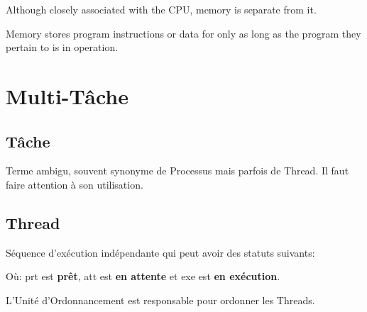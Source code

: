 \documentclass{article}
\begin{document}
\begin{definition}
    \begin{remark}
        Although closely associated with the CPU, memory is separate from it.
    \end{remark}
    
    \begin{remark}
        Memory stores program instructions or data for only as long as the program they pertain to is in operation.
    \end{remark}
\end{definition}



\section{Multi-Tâche}


\subsection{Tâche}
\begin{definition}\label{def:tache}
    Terme ambigu, souvent synonyme de Processus mais parfois de Thread. Il faut faire attention à son utilisation.
\end{definition}

\subsection{Thread}
\begin{definition}\label{def:thread}
    Séquence d'exécution indépendante qui peut avoir des statuts suivants:
    \begin{figure}[H]
        \centering
    \end{figure}
    Où: prt est \textbf{prêt}, att est \textbf{en attente} et exe est \textbf{en exécution}.
    
    \begin{remark}
        L'Unité d'Ordonnancement est responsable pour ordonner les Threads.
    \end{remark}
\end{definition}
\end{document}
